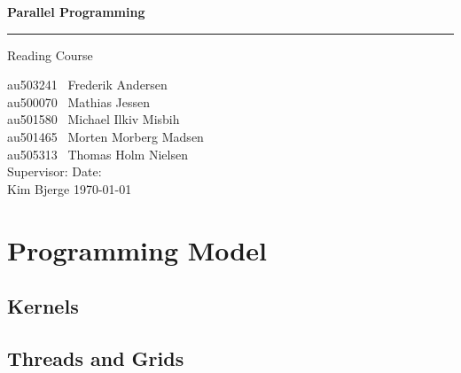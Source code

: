 \documentclass[12px,oz]{report}
\begin{document}
	
	\begin{titlepage}
		\centering
		\vspace*{3\baselineskip}
		{\Huge \bfseries Parallel Programming}
		\rule{\linewidth}{0.5mm}
		\LARGE
		Reading Course
		\\
		\null\vfill
		\begin{flushleft} \large
			au503241 \hspace*{2em} \  Frederik Andersen\\
			au500070 \hspace*{2em} \  Mathias Jessen\\
			au501580 \hspace*{2em} \  Michael Ilkiv Misbih\\
			au501465 \hspace*{2em} \  Morten Morberg Madsen\\
			au505313 \hspace*{2em} \  Thomas Holm Nielsen\\
			\vspace{100pt}
			Supervisor:\hspace{94pt}  Date: \\
			Kim Bjerge \hspace{90pt}  \today\\
		\end{flushleft}
		\vspace*{6\baselineskip}
	\end{titlepage}

\tableofcontents
\clearpage
{}
\cleardoublepage

\chapter{Programming Model}
\label{ch-programming-model}


	\section{Kernels}
	\label{sec-pm-kernels}
	

	\section{Threads and Grids}
	\label{sec-pm-threads}
	
	
\end{document}
